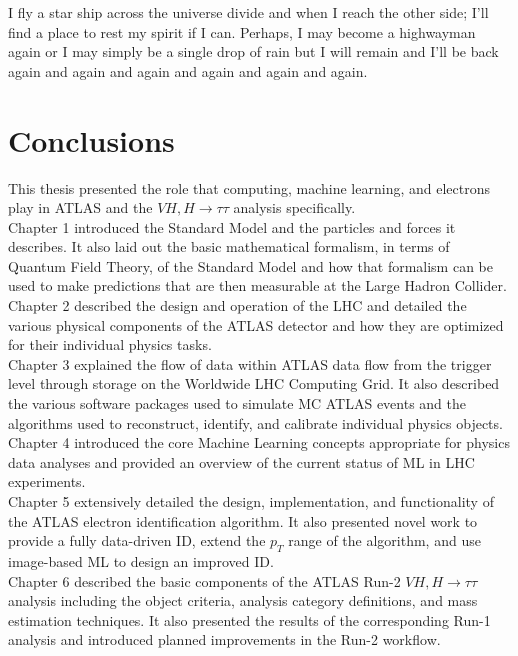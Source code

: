 \begin{savequote}[75mm]
I fly a star ship across the universe divide and when I reach the other side; I'll find a place to rest my spirit if I can. Perhaps, I may become a highwayman again or I may simply be a single drop of rain but I will remain and I'll be back again and again and again and again and again and again.
\end{savequote}

\chapter{Conclusions}
This thesis presented the role that computing, machine learning, and electrons play in ATLAS and the $VH,H\rightarrow\tau\tau$ analysis specifically.\\

Chapter 1 introduced the Standard Model and the particles and forces it describes. It also laid out the basic mathematical formalism, in terms of Quantum Field Theory, of the Standard Model and how that formalism can be used to make predictions that are then measurable at the Large Hadron Collider.\\

Chapter 2 described the design and operation of the LHC and detailed the various physical components of the ATLAS detector and how they are optimized for their individual physics tasks.\\

Chapter 3 explained the flow of data within ATLAS data flow from the trigger level through storage on the Worldwide LHC Computing Grid. It also described the various software packages used to simulate MC ATLAS events and the algorithms used to reconstruct, identify, and calibrate individual physics objects.\\

Chapter 4 introduced the core Machine Learning concepts appropriate for physics data analyses and provided an overview of the current status of ML in LHC experiments.\\

Chapter 5 extensively detailed the design, implementation, and functionality of the ATLAS electron identification algorithm. It also presented novel work to provide a fully data-driven ID, extend the $p_T$ range of the algorithm, and use image-based ML to design an improved ID.\\

Chapter 6 described the basic components of the ATLAS Run-2 $VH,H\rightarrow\tau\tau$ analysis including the object criteria, analysis category definitions, and mass estimation techniques. It also presented the results of the corresponding Run-1 analysis and introduced planned improvements in the Run-2 workflow.\\

